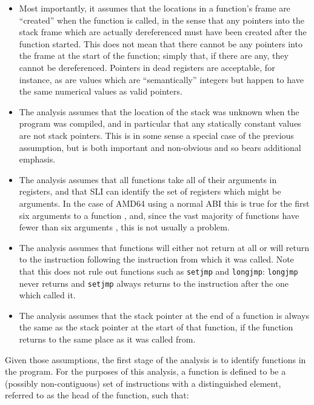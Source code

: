 \begin{itemize}
\item
  Most importantly, it assumes that the locations in a function's
  frame are ``created'' when the function is called, in the sense that
  any pointers into the stack frame which are actually dereferenced
  must have been created after the function started.  This does not
  mean that there cannot be any pointers into the frame at the start
  of the function; simply that, if there are any, they cannot be
  dereferenced.  Pointers in dead registers are acceptable, for
  instance, as are values which are ``semantically'' integers but
  happen to have the same numerical values as valid pointers.

\item
  The analysis assumes that the location of the stack was unknown when
  the program was compiled, and in particular that any statically
  constant values are not stack pointers.  This is in some sense a
  special case of the previous assumption, but is both important and
  non-obvious and so bears additional emphasis.

\item
  The analysis assumes that all functions take all of their arguments
  in registers, and that SLI can identify the set of registers which
  might be arguments.  In the case of AMD64 using a normal ABI this is
  true for the first six arguments to a function \needCite{}, and,
  since the vast majority of functions have fewer than six arguments
  \needCite{}, this is not usually a problem.

\item
  The analysis assumes that functions will either not return at all or
  will return to the instruction following the instruction from which
  it was called.  Note that this does not rule out functions such as
  \verb|setjmp| and \verb|longjmp|: \verb|longjmp| never returns and
  \verb|setjmp| always returns to the instruction after the one which
  called it.

\item
  The analysis assumes that the stack pointer at the end of a function
  is always the same as the stack pointer at the start of that
  function, if the function returns to the same place as it was called
  from.
\end{itemize}

Given those assumptions, the first stage of the analysis is to
identify functions in the program.  For the purposes of this analysis,
a function is defined to be a (possibly non-contiguous) set of
instructions with a distinguished element, referred to as the head of
the function, such that:

